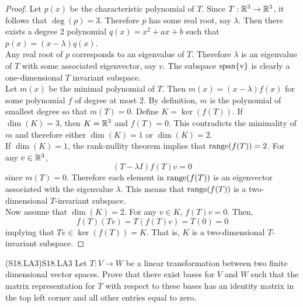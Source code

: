\documentclass[../AlgebraQualSolutions.tex]{subfiles}
\begin{document}
	\begin{proof}
		Let $p(x)$ be the characteristic polynomial of $T$. Since $T: \mathbb{R}^3 \to \mathbb{R}^3$, it follows that $\deg(p) = 3$. Therefore $p$ has some real root, say $\lambda$. Then there exists a degree 2 polynomial $q(x) = x^2 + ax + b$ such that $p(x) = (x-\lambda)q(x)$.\\

		Any real root of $p$ corresponds to an eigenvalue of $T$. Therefore $\lambda$ is an eigenvalue of $T$ with some associated eigenvector, say $v$. The subspace $\rm{span}\{v\}$ is clearly a one-dimensional $T$ invariant subspace.\\

		Let $m(x)$ be the minimal polynomial of $T$. Then $m(x) = (x-\lambda)f(x)$ for some polynomial $f$ of degree at most 2. By definition, $m$ is the polynomial of smallest degree so that $m(T) = 0$. Define $K = \ker(f(T))$. If $\dim(K) = 3$, then $K = \mathbb{R}^3$ and $f(T) = 0$. This contradicts the minimality of $m$ and therefore either $\dim(K) = 1$ or $\dim(K) = 2$.\\

		If $\dim(K) = 1$, the rank-nullity theorem implies that $\mathrm{range}(f(T)) = 2$. For any $v \in \mathbb{R}^3$,
			\[(T - \lambda I)f(T)v = 0\]
		since $m(T) = 0$. Therefore each element in $\mathrm{range}(f(T))$ is an eigenvector associated with the eigenvalue $\lambda$. This means that $\mathrm{range}(f(T))$ is a two-dimensional $T$-invariant subspace.\\

		Now assume that $\dim(K) = 2$. For any $v \in K$, $f(T)v = 0$. Then,
			\[f(T)(Tv) = T(f(T)v) = T(0) = 0\]
		implying that $Tv \in \ker(f(T)) = K$. That is, $K$ is a two-dimensional $T$-invariant subspace.
	\end{proof}

	\begin{prob}{(S18.LA3)}{S18.LA3}
		Let $T: V \to W$ be a linear transformation between two finite dimensional vector spaces. Prove that there exist bases for $V$ and $W$ such that the matrix representation for $T$ with respect to these bases has an identity matrix in the top left corner and all other entries equal to zero.
	\end{prob}
\end{document}
